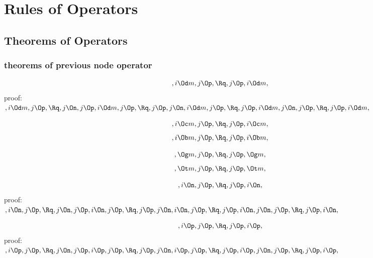 
\chapter{Rules of Operators}

\newpage
\section{Theorems of Operators}


\subsection{theorems of previous node operator}

\[,i \Od m, j \Op, \Rq , j \Op, i \Od m,\]
\bigskip
proof:\\
\begin{math} 
,i \Od m, j \Op, \\\\
\Rq, j \On, j \Op, i \Od m, j \Op, \\\\
\Rq, j \Op, j \On, i \Od m, j \Op, \\\\
\Rq, j \Op, i \Od m, j \On, j \Op, \\\\
\Rq, j \Op,i \Od m,
\end{math}
\bigskip

\[,i \Oc m, j \Op, \Rq , j \Op, i \Oc m,\]
\[,i \Ob m, j \Op, \Rq , j \Op, i \Ob m,\]

\[, \Og m, j \Op, \Rq , j \Op,  \Og m,\]
\[, \Ot m, j \Op, \Rq , j \Op,  \Ot m,\]

\[,i \On, j \Op, \Rq , j \Op, i \On,\]
\bigskip
proof:\\
\begin{math} 
,i \On, j \Op, \\\\
\Rq, j \On, j \Op, i \On, j \Op, \\\\
\Rq, j \Op, j \On, i \On, j \Op, \\\\
\Rq, j \Op, i \On, j \On, j \Op, \\\\
\Rq, j \Op, i \On,
\end{math}
\bigskip

\[,i \Op, j \Op, \Rq , j \Op, i \Op,\]
\bigskip
proof:\\
\begin{math} 
,i \Op, j \Op, \\\\
\Rq, j \On, j \Op, i \Op, j \Op, \\\\
\Rq, j \Op, j \On, i \Op, j \Op, \\\\
\Rq, j \Op, i \Op, j \On, j \Op, \\\\
\Rq, j \Op, i \Op,
\end{math}
\bigskip




